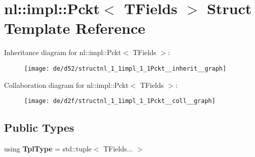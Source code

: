 \hypertarget{structnl_1_1impl_1_1Pckt}{}\section{nl\+:\+:impl\+:\+:Pckt$<$ T\+Fields $>$ Struct Template Reference}
\label{structnl_1_1impl_1_1Pckt}


Inheritance diagram for nl\+:\+:impl\+:\+:Pckt$<$ T\+Fields $>$\+:\nopagebreak
\begin{figure}[H]
\begin{center}
\leavevmode
\texttt{[image: de/d52/structnl\_1\_1impl\_1\_1Pckt\_\_inherit\_\_graph]}
\end{center}
\end{figure}


Collaboration diagram for nl\+:\+:impl\+:\+:Pckt$<$ T\+Fields $>$\+:\nopagebreak
\begin{figure}[H]
\begin{center}
\leavevmode
\texttt{[image: de/d2f/structnl\_1\_1impl\_1\_1Pckt\_\_coll\_\_graph]}
\end{center}
\end{figure}
\subsection*{Public Types}
\begin{DoxyCompactItemize}
\item 
\hypertarget{structnl_1_1impl_1_1Pckt_a68f3f720d95233652c169c971e271d8a}{}using {\bfseries Tpl\+Type} = std\+::tuple$<$ T\+Fields... $>$\label{structnl_1_1impl_1_1Pckt_a68f3f720d95233652c169c971e271d8a}

\end{DoxyCompactItemize}
